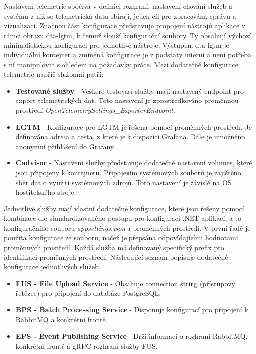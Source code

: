 Nastavení telemetrie spočívá v definici rozhraní, nastavení chování služeb a systémů z niž se telemetrická data sbírají, jejich cíl pro zpracování, správu a vizualizaci. Značnou část konfigurace představuje propojení nástrojů aplikace v rámci obrazu dta-lgtm, k čemuž slouží konfigurační soubory. Ty obsahují výchozí minimalistickou konfiguraci pro jednotlivé nástroje. Výstupem dta-lgtm je individuální kontejner a zmíněná konfigurace je z podstaty interní a není potřeba s ní manipulovat s ohledem na požadavky práce. Mezi dodatečné konfigurace telemetrie napříč službami patří:

\begin{itemize}
    \item \textbf{Testované služby} - Veškeré testovací služby mají nastavený endpoint pro export telemetrických dat. Toto nastavení je zprostředkováno proměnnou prostředí \emph{OpenTelemetrySettings\_ExporterEndpoint}.
    \item \textbf{LGTM} - Konfigurace pro LGTM je řešena pomocí proměnných prostředí. Je definována adresa a cesta, z které je k dispozici Grafana. Dále je umožněno anonymní přihlášení do Grafany.
    \item \textbf{Cadvisor} - Nastavení služby představuje dodatečné nastavení volumes, které jsou připojeny k kontejneru. Připojením systémových souborů je zajištěno sběr dat o využití systémových zdrojů. Toto nastavení je závislé na OS hostitelského stroje.
\end{itemize}

Jednotlivé služby mají vlastní dodatečné konfigurace, které jsou řešeny pomocí kombinace dle standardizovaného postupu pro konfiguraci .NET aplikací, a to konfiguračního souboru \emph{appsettings.json} a proměnných prostředí. V první řadě je použita konfigurace ze souboru, načež je přepsána odpovídajícími hodnotami proměnných prostředí. Každá služba má definovaný specifický prefix pro identifikaci proměnných prostředí. Následující seznam popisuje dodatečné konfigurace jednotlivých služeb.

\begin{itemize}
  \item \textbf{FUS - File Upload Service} - Obsahuje connection string (přístupový řetězec) pro připojení do databáze PostgreSQL.
  \item \textbf{BPS - Batch Processing Service} - Disponuje konfigurací pro připojení k RabbitMQ a konkrétní frontě.
  \item \textbf{EPS - Event Publishing Service} - Drží informaci o rozhraní RabbitMQ, konkrétní frontě a gRPC rozhraní služby FUS.
\end{itemize}

